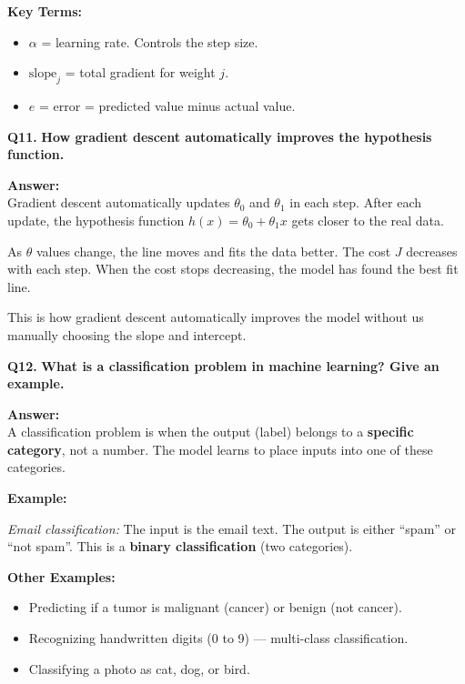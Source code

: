 \documentclass[12pt,a4paper]{article}
\newcommand{\question}[2]{%
    \begin{mdframed}[style=questionstyle]
        \textbf{\textcolor{headerblue}{Q#1.}} \textbf{#2}
    \end{mdframed}%
    \vspace{2pt}%
}
\newcommand{\ans}{\textbf{\textcolor{headerblue}{Answer:}}\\[4pt]}
\newcommand{\subhead}[1]{\textbf{\textcolor{headerblue}{#1}}}
\begin{document}
\subhead{Key Terms:}
\begin{itemize}[leftmargin=*]
    \item $\alpha$ = learning rate. Controls the step size.
    \item $\text{slope}_j$ = total gradient for weight $j$.
    \item $e$ = error = predicted value minus actual value.
\end{itemize}

\vspace{10pt}
\question{11}{How gradient descent automatically improves the hypothesis function.}

\ans

Gradient descent automatically updates $\theta_0$ and $\theta_1$ in each step. After each update, the hypothesis function $h(x) = \theta_0 + \theta_1 x$ gets closer to the real data.

As $\theta$ values change, the line moves and fits the data better. The cost $J$ decreases with each step. When the cost stops decreasing, the model has found the best fit line.

This is how gradient descent automatically improves the model without us manually choosing the slope and intercept.

\vspace{10pt}
\question{12}{What is a classification problem in machine learning? Give an example.}

\ans

A classification problem is when the output (label) belongs to a \textbf{specific category}, not a number. The model learns to place inputs into one of these categories.

\subhead{Example:}

\textit{Email classification:} The input is the email text. The output is either ``spam'' or ``not spam''. This is a \textbf{binary classification} (two categories).

\subhead{Other Examples:}
\begin{itemize}[leftmargin=*]
    \item Predicting if a tumor is malignant (cancer) or benign (not cancer).
    \item Recognizing handwritten digits (0 to 9) --- multi-class classification.
    \item Classifying a photo as cat, dog, or bird.
\end{itemize}
\end{document}
